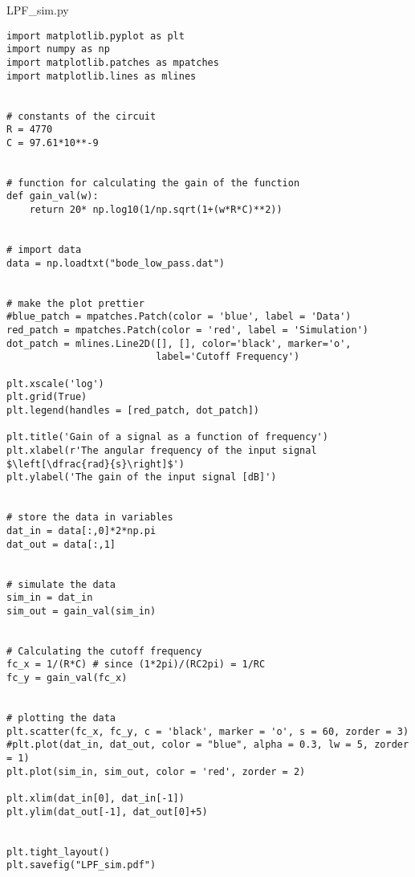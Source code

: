 \lstlistingname{ LPF\_sim.py}
\begin{lstlisting}[breaklines]
import matplotlib.pyplot as plt
import numpy as np
import matplotlib.patches as mpatches
import matplotlib.lines as mlines


# constants of the circuit
R = 4770
C = 97.61*10**-9


# function for calculating the gain of the function
def gain_val(w):
    return 20* np.log10(1/np.sqrt(1+(w*R*C)**2))


# import data
data = np.loadtxt("bode_low_pass.dat")


# make the plot prettier
#blue_patch = mpatches.Patch(color = 'blue', label = 'Data')
red_patch = mpatches.Patch(color = 'red', label = 'Simulation')
dot_patch = mlines.Line2D([], [], color='black', marker='o',
                          label='Cutoff Frequency')

plt.xscale('log')
plt.grid(True)
plt.legend(handles = [red_patch, dot_patch])

plt.title('Gain of a signal as a function of frequency')    
plt.xlabel(r'The angular frequency of the input signal $\left[\dfrac{rad}{s}\right]$')
plt.ylabel('The gain of the input signal [dB]')


# store the data in variables
dat_in = data[:,0]*2*np.pi
dat_out = data[:,1]


# simulate the data
sim_in = dat_in
sim_out = gain_val(sim_in)


# Calculating the cutoff frequency
fc_x = 1/(R*C) # since (1*2pi)/(RC2pi) = 1/RC
fc_y = gain_val(fc_x)


# plotting the data
plt.scatter(fc_x, fc_y, c = 'black', marker = 'o', s = 60, zorder = 3)
#plt.plot(dat_in, dat_out, color = "blue", alpha = 0.3, lw = 5, zorder = 1)
plt.plot(sim_in, sim_out, color = 'red', zorder = 2)

plt.xlim(dat_in[0], dat_in[-1])
plt.ylim(dat_out[-1], dat_out[0]+5)


plt.tight_layout()
plt.savefig("LPF_sim.pdf")

\end{lstlisting}